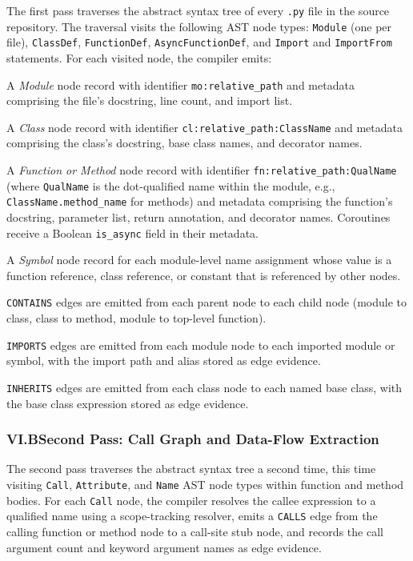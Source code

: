 \documentclass[12pt]{article}
\begin{document}
The first pass traverses the abstract syntax tree of every \texttt{.py} file in
the source repository. The traversal visits the following AST node types:
\texttt{Module} (one per file), \texttt{ClassDef}, \texttt{FunctionDef},
\texttt{AsyncFunctionDef}, and \texttt{Import} and \texttt{ImportFrom}
statements. For each visited node, the compiler emits:

A \emph{Module} node record with identifier \texttt{mo:relative\_path} and
metadata comprising the file's docstring, line count, and import list.

A \emph{Class} node record with identifier \texttt{cl:relative\_path:ClassName}
and metadata comprising the class's docstring, base class names, and decorator
names.

A \emph{Function or Method} node record with identifier
\texttt{fn:relative\_path:QualName} (where \texttt{QualName} is the
dot-qualified name within the module, e.g., \texttt{ClassName.method\_name} for
methods) and metadata comprising the function's docstring, parameter list, return
annotation, and decorator names. Coroutines receive a Boolean \texttt{is\_async}
field in their metadata.

A \emph{Symbol} node record for each module-level name assignment whose value is
a function reference, class reference, or constant that is referenced by other
nodes.

\texttt{CONTAINS} edges are emitted from each parent node to each child node
(module to class, class to method, module to top-level function).

\texttt{IMPORTS} edges are emitted from each module node to each imported module
or symbol, with the import path and alias stored as edge evidence.

\texttt{INHERITS} edges are emitted from each class node to each named base
class, with the base class expression stored as edge evidence.

\subsubsection{VI.B\quad Second Pass: Call Graph and Data-Flow Extraction}

The second pass traverses the abstract syntax tree a second time, this time
visiting \texttt{Call}, \texttt{Attribute}, and \texttt{Name} AST node types
within function and method bodies. For each \texttt{Call} node, the compiler
resolves the callee expression to a qualified name using a scope-tracking
resolver, emits a \texttt{CALLS} edge from the calling function or method node to
a call-site stub node, and records the call argument count and keyword argument
names as edge evidence.
\end{document}
